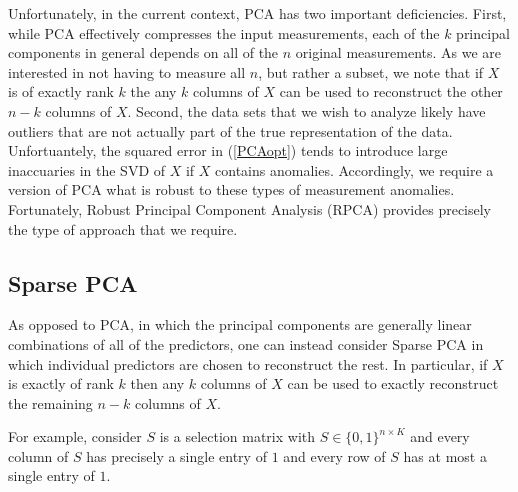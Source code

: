 \documentclass[conference]{IEEEtran}
\begin{document}
Unfortunately, in the current context, PCA has two important deficiencies.  First, while PCA effectively compresses the input measurements, each of the $k$ principal components in general depends on all of the $n$ original measurements.   As we are interested in not having to measure all $n$, but rather a subset, we note that if $X$ is of exactly rank $k$ the any $k$ columns of $X$ can be used to reconstruct the other $n-k$ columns of $X$.
Second, the data sets that we wish to analyze likely have outliers that are not actually part of the true representation of the data.  Unfortuantely, the squared error in (\ref{PCAopt}) tends to introduce large inaccuaries in the SVD of $X$ if $X$ contains anomalies.
Accordingly, we require a version of PCA what is robust to these types of measurement anomalies.   Fortunately, Robust Principal Component Analysis (RPCA) \cite{Candes2009,
 Candes2011, Chandrasekaran2009, Cai2010, Paffenroth2012a,Paffenroth2013b} provides precisely the type of approach that we require.   

\subsection{Sparse PCA}\label{SPCA}

As opposed to PCA, in which the principal components are generally linear combinations of all of the predictors, one can instead consider Sparse PCA \cite{htf01} in which individual predictors are chosen to reconstruct the rest. In particular, if $X$ is exactly of rank $k$ then any $k$ columns of $X$ can be used to exactly reconstruct the remaining $n-k$ columns of $X$.


For example, consider $S$ is a selection matrix with $S \in \{0,1\}^{n \times K}$ and every column of $S$ has precisely a single entry of $1$ and every row of $S$ has at most a single entry of $1$.
\end{document}
